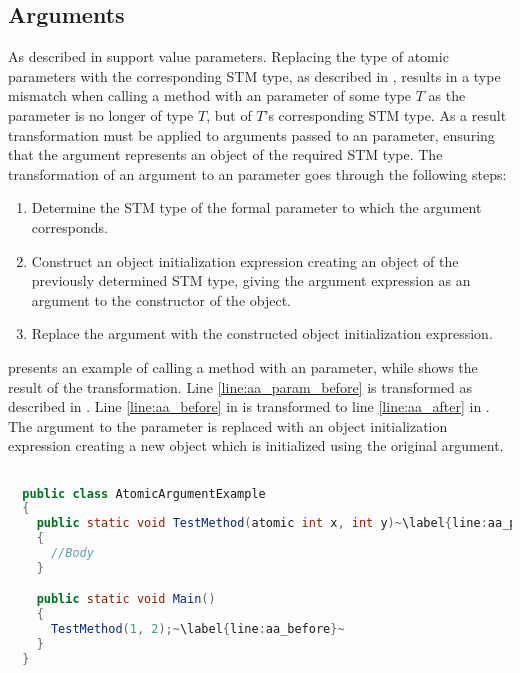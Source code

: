 \subsection{Arguments}
As described in  \stmnamesp support value parameters. Replacing the type of atomic parameters with the corresponding \ac{STM} type, as described in , results in a type mismatch when calling a method with an  parameter of some type $T$ as the parameter is no longer of type $T$, but of $T$'s corresponding \ac{STM} type. As a result transformation must be applied to arguments passed to an  parameter, ensuring that the argument represents an object of the required \ac{STM} type. The transformation of an argument to an  parameter goes through the following steps:

\begin{enumerate}
	\item Determine the \ac{STM} type of the formal parameter to which the argument corresponds.
	\item Construct an object initialization expression creating an object of the previously determined \ac{STM} type, giving the argument expression as an argument to the constructor of the object.
	\item Replace the argument with the constructed object initialization expression.
\end{enumerate}

 presents an example of calling a method with an  parameter, while  shows the result of the transformation. Line \ref{line:aa_param_before} is transformed as described in . Line \ref{line:aa_before} in  is transformed to line \ref{line:aa_after} in . The argument to the  parameter is replaced with an object initialization expression creating a new  object which is initialized using the original argument.

\begin{lstlisting}[label=lst:before_atomic_argument,
  caption={\bscode{atomic} Argument Before Transformation},
  language=Java,  
  showspaces=false,
  showtabs=false,
  breaklines=true,
  showstringspaces=false,
  breakatwhitespace=true,
  escapechar=~,
  commentstyle=\color{greencomments},
  keywordstyle=\color{bluekeywords},
  stringstyle=\color{redstrings},
  morekeywords={atomic, retry, orelse, var, get, set, ret, out}]  % Start your code-block

  public class AtomicArgumentExample
  {
    public static void TestMethod(atomic int x, int y)~\label{line:aa_param_before}~
    {
      //Body
    }

    public static void Main()
    {
      TestMethod(1, 2);~\label{line:aa_before}~
    }
  }
\end{lstlisting}

